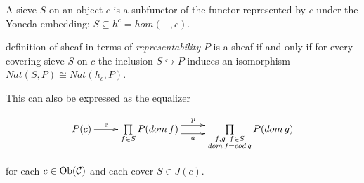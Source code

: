 \begin{frame}
A sieve $S$ on an object $c$ is a subfunctor of the functor represented by $c$ under the Yoneda embedding: $S \subseteq h^c = hom(-,c)$. 
\begin{block}{definition of sheaf in terms of {\it representability}}
$P$ is a sheaf if and only if for every covering sieve $S$ on $c$ the inclusion $S \hookrightarrow P$ induces an isomorphism $Nat(S,P) \cong Nat(h_c,P)$. 
\end{block}
This can also be expressed as the equalizer
\begin{block}{}
\begin{displaymath}
\xymatrix{
P(c) \ar[r]^-{e}
&
\prod\limits_{f \in S}
P(dom \, f)
\ar@<1ex>[r]^-{p} \ar@<-1ex>[r]_-{a}
&
\prod\limits_{\substack{f,g \,\,\, f \in S \\ dom \, f=cod \, g}}
P(dom \, g)
}
\end{displaymath}
\end{block}
for each $c \in \mathop{\rm Ob}\nolimits({\mathcal C})$ and each cover $S \in J(c)$.
\end{frame}